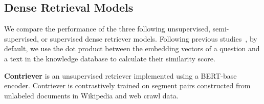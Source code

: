 




\subsection{Dense Retrieval Models}
We compare the performance of the three following unsupervised, semi-supervised,  or supervised dense retriever models. Following previous studies~\cite{lewisRetrievalaugmentedGenerationKnowledgeintensive2020a}, by default, we use the dot product between the embedding vectors of a question and a text in the knowledge database to calculate their similarity score. 

\textbf{Contriever} \cite{izacardUnsupervisedDenseInformation2021} is an unsupervised retriever implemented using a BERT-base encoder. Contriever is contrastively trained on segment pairs constructed from unlabeled documents in Wikipedia and web crawl data.

